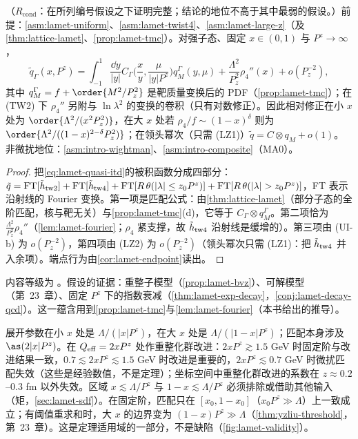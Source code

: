 \begin{theorem}\label{thm:lamet-hadronic}
（$R_{\mathrm{cond}}$：在所列编号假设之下证明完整；结论的地位不高于其中最弱的假设。）前提：\cref{asm:lamet-uniform}、\cref{asm:lamet-twist4}、\cref{asm:lamet-large-z}（及 \cref{thm:lattice-lamet}、\cref{prop:lamet-tmc}）。对强子态、固定 $x\in(0,1)$ 与 $P^z\to\infty$，
\begin{equation}\label{eq:lamet-hadronic}
\tilde q_\Gamma(x,P^z)=\int_{-1}^1\frac{\dd y}{|y|}C_\Gamma\Big(\frac xy,\frac\mu{|y|P^z}\Big)q^\Gamma_M(y,\mu)+\frac{\Lambda^2}{P_z^2}\rho_4''(x)+o(P_z^{-2}),
\end{equation}
其中 $q^\Gamma_M=f+\order{M^2/P_z^2}$ 是靶质量变换后的 PDF（\cref{prop:lamet-tmc}）；在 (TW2) 下 $\rho_4''$ 另附与 $\ln\lambda^2$ 的变换的卷积（只有对数修正）。因此相对修正在小 $x$ 处为 $\order{\Lambda^2/(x^2P_z^2)}$，在大 $x$ 处若 $\rho_4/f\sim(1-x)^\delta$ 则为 $\order{\Lambda^2/((1-x)^{2-\delta}P_z^2)}$；在领头幂次（只需 (LZ1)）$\tilde q=C\otimes q_M+o(1)$。
非微扰地位：\cref{asm:intro-wightman}、\cref{asm:intro-composite}（MA0）。
\end{theorem}

\begin{proof}
把\cref{eq:lamet-quasi-itd}的被积函数分成四部分：$\tilde q={\rm FT}[\tilde h_{\rm tw2}]+{\rm FT}[\tilde h_{\rm tw4}]+{\rm FT}[R\,\theta(|\lambda|\le z_0P^z)]+{\rm FT}[R\,\theta(|\lambda|>z_0P^z)]$，FT 表示沿射线的 Fourier 变换。第一项是匹配公式：由\cref{thm:lattice-lamet}（部分子态的全阶匹配，核与靶无关）与\cref{prop:lamet-tmc}(d)，它等于 $C_\Gamma\otimes q^\Gamma_M$。第二项恰为 $\frac{\Lambda^2}{P_z^2}\rho_4''$（\cref{lem:lamet-fourier}；$\rho_4$ 紧支撑，故 $\tilde h_{\rm tw4}$ 沿射线是缓增的）。第三项由 (UI-b) 为 $o(P_z^{-2})$，第四项由 (LZ2) 为 $o(P_z^{-2})$（领头幂次只需 (LZ1)：把 $\tilde h_{\rm tw4}$ 并入余项）。端点行为由\cref{cor:lamet-endpoint}读出。
\end{proof}

内容等级为 \tagC。假设的证据：重整子模型（\cref{prop:lamet-bvz}）、可解模型（第~23~章）、固定 $P^z$ 下的指数衰减（\cref{thm:lamet-exp-decay}，\cref{conj:lamet-decay-qcd}）。这一蕴含用到\cref{prop:lamet-tmc}与\cref{lem:lamet-fourier}（本书给出的推导）。

\begin{remark}\label{rem:lamet-domain}
展开参数在小 $x$ 处是 $\Lambda/(|x|P^z)$，在大 $x$ 处是 $\Lambda/(|1-x|P^z)$；匹配本身涉及 $\as(2|x|P^z)$。在 $Q_{\rm eff}=2xP^z$ 处作重整化群改进\cite{Su:2022fiu}：$2xP^z\gtrsim1.5$ GeV 时固定阶与改进结果一致，$0.7\lesssim2xP^z\lesssim1.5$ GeV 时改进是重要的，$2xP^z\lesssim0.7$ GeV 时微扰匹配失效（这些是经验数值，不是定理）；坐标空间中重整化群改进的系数在 $z\approx0.2$--$0.3$ fm 以外失效。区域 $x\lesssim\Lambda/P^z$ 与 $1-x\lesssim\Lambda/P^z$ 必须排除或借助其他输入（矩，\cref{sec:lamet-sdf}）。在固定阶，匹配只在 $[x_0,1-x_0]$（$x_0P^z\gg\Lambda$）上一致成立；有阈值重求和时，大 $x$ 的边界变为 $(1-x)P^z\gg\Lambda$（\cref{thm:yzliu-threshold}，第~23~章）。这是定理适用域的一部分，不是缺陷（\cref{fig:lamet-validity}）。
\end{remark}

